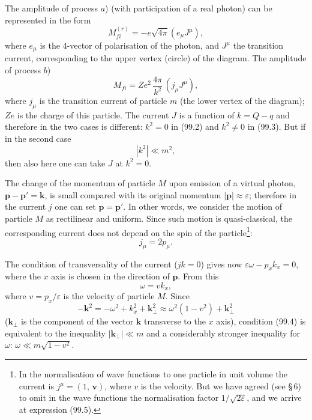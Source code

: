 The amplitude of process $a$) (with participation of a real photon) can be represented in the form
\begin{equation}
M_{fi}^{(r)} = -e\sqrt{4\pi}(e_\mu J^\mu),
\label{eq:99.2}
\end{equation}
where $e_\mu$ is the 4-vector of polarisation of the photon, and $J^\mu$ the transition current, corresponding to the upper vertex (circle) of the diagram. The amplitude of process $b$)
\begin{equation}
M_{fi} = Ze^2\,\frac{4\pi}{k^2}\,(j_\mu J^\mu),
\label{eq:99.3}
\end{equation}
where $j_\mu$ is the transition current of particle $m$ (the lower vertex of the diagram); $Ze$ is the charge of this particle. The current $J$ is a function of $k = Q - q$ and therefore in the two cases is different: $k^2 = 0$ in (99.2) and $k^2 \neq 0$ in (99.3). But if in the second case
\begin{equation}
|k^2| \ll m^2,
\label{eq:99.4}
\end{equation}
then also here one can take $J$ at $k^2 = 0$.

The change of the momentum of particle $M$ upon emission of a virtual photon, $\mathbf{p} - \mathbf{p}' = \mathbf{k}$, is small compared with its original momentum $|\mathbf{p}| \approx \varepsilon$; therefore in the current $j$ one can set $\mathbf{p} = \mathbf{p}'$. In other words, we consider the motion of particle $M$ as rectilinear and uniform. Since such motion is quasi-classical, the corresponding current does not depend on the spin of the particle\footnote{In the normalisation of wave functions to one particle in unit volume the current is $j^\mu = (1,\,\mathbf{v})$, where $v$ is the velocity. But we have agreed (see \S\,6) to omit in the wave functions the normalisation factor $1/\sqrt{2\varepsilon}$, and we arrive at expression (99.5).}:
\begin{equation}
j_\mu = 2p_\mu.
\label{eq:99.5}
\end{equation}


The condition of transversality of the current ($jk = 0$) gives now $\varepsilon\omega - p_x k_x = 0$, where the $x$ axis is chosen in the direction of $\mathbf{p}$. From this
\begin{equation}
\omega = vk_x,
\label{eq:99.6}
\end{equation}
where $v = p_x/\varepsilon$ is the velocity of particle $M$. Since
\begin{equation}
-\mathbf{k}^2 = -\omega^2 + k_x^2 + \mathbf{k}_\perp^2 \approx \omega^2(1 - v^2) + \mathbf{k}_\perp^2
\label{eq:99.7}
\end{equation}
($\mathbf{k}_\perp$ is the component of the vector $\mathbf{k}$ transverse to the $x$ axis), condition (99.4) is equivalent to the inequality $|\mathbf{k}_\perp| \ll m$ and a considerably stronger inequality for $\omega$: $\omega \ll m\sqrt{1 - v^2}$.


